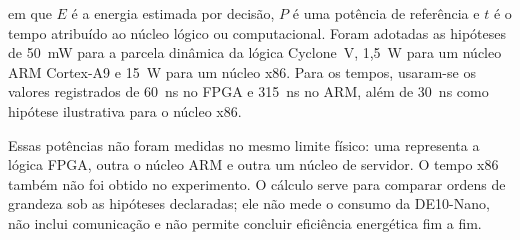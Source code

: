 em que $E$ é a energia estimada por decisão, $P$ é uma potência de referência e $t$ é o tempo atribuído ao núcleo lógico ou computacional. Foram adotadas as hipóteses de 50~mW para a parcela dinâmica da lógica Cyclone~V, 1,5~W para um núcleo ARM Cortex-A9 e 15~W para um núcleo x86. Para os tempos, usaram-se os valores registrados de 60~ns no FPGA e 315~ns no ARM, além de 30~ns como hipótese ilustrativa para o núcleo x86.

Essas potências não foram medidas no mesmo limite físico: uma representa a lógica FPGA, outra o núcleo ARM e outra um núcleo de servidor. O tempo x86 também não foi obtido no experimento. O cálculo serve para comparar ordens de grandeza sob as hipóteses declaradas; ele não mede o consumo da DE10-Nano, não inclui comunicação e não permite concluir eficiência energética fim a fim.
